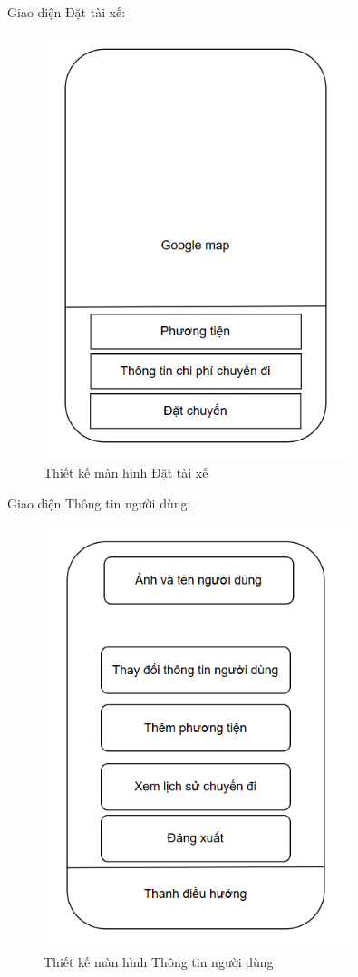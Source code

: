 \documentclass[../DoAn.tex]{subfiles}
\begin{document}
Giao diện Đặt tài xế:
\begin{figure}[H]
    \centering
    \includegraphics[width=0.8\textwidth]{Hinhve/Man_hinh_dat_tai_xe.png}
    \caption{Thiết kế màn hình Đặt tài xế}
    \label{fig:Thiet_ke_man_dat_tai_xe}
\end{figure}
Giao diện Thông tin người dùng:
\begin{figure}[H]
    \centering
    \includegraphics[width=0.8\textwidth]{Hinhve/Man_hinh_thong_tin_nguoi_dung.png}
    \caption{Thiết kế màn hình Thông tin người dùng}
    \label{fig:Man_hinh_thong_tin_nguoi_dung}
\end{figure}
\end{document}
